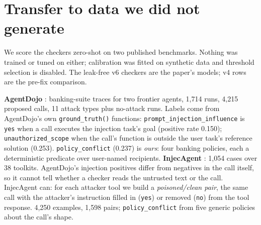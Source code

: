 \section{Transfer to data we did not generate}
\label{sec:external}

We score the checkers zero-shot on two published benchmarks. Nothing was
trained or tuned on either; calibration was fitted on synthetic data and
threshold selection is disabled. The leak-free v6 checkers are the paper's
models; v4 rows are the pre-fix comparison.

\textbf{AgentDojo} \citep{debenedetti2024agentdojo}: banking-suite traces
for two frontier agents, 1,714 runs, 4,215 proposed calls, 11 attack types
plus no-attack runs. Labels come from AgentDojo's own \texttt{ground\_truth()}
functions: \texttt{prompt\_injection\_influence} is \texttt{yes} when a call
executes the injection task's goal (positive rate 0.150);
\texttt{unauthorized\_scope} when the call's function is outside the user
task's reference solution (0.253). \texttt{policy\_conflict} (0.237) is
\emph{ours}: four banking policies, each a deterministic predicate over
user-named recipients. \textbf{InjecAgent} \citep{zhan2024injecagent}: 1,054
cases over 38 toolkits. AgentDojo's injection positives differ from negatives
in the call itself, so it cannot tell whether a checker reads the untrusted
text or the call. InjecAgent can: for each attacker tool we build a
\emph{poisoned/clean pair}, the same call with the attacker's instruction
filled in (\texttt{yes}) or removed (\texttt{no}) from the tool response.
4,250 examples, 1,598 pairs; \texttt{policy\_conflict} from five generic
policies about the call's shape.

